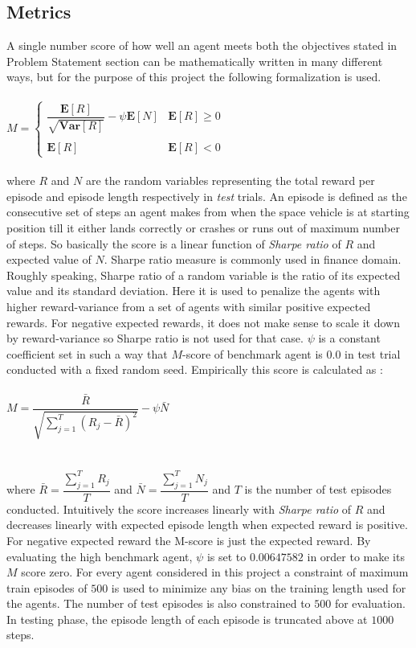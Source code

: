 \documentclass{article}
\begin{document}
\subsection*{Metrics}
A single number score of how well an agent meets both the objectives stated in Problem Statement section can be mathematically written in many different ways, but for the purpose of this project the following formalization is used.\\\\
$M = \begin{cases} \dfrac{\mathbf{E}[R]}{\sqrt{\mathbf{Var}[R]}} - \psi \mathbf{E}[N] & \mathbf{E}[R] \ge 0\\\\
 \mathbf{E}[R] & \mathbf{E}[R] < 0 \end{cases}$\\\\
where $R$ and $N$ are the random variables representing the total reward per episode and episode length respectively in \textit{test} trials. An episode is defined as the consecutive set of steps an agent makes from when the space vehicle is at starting position till it either lands correctly or crashes or runs out of maximum number of steps. So basically the score is a linear function of \textit{Sharpe ratio} of $R$ and expected value of $N$. Sharpe ratio measure is commonly used in finance domain. Roughly speaking, Sharpe ratio of a random variable is the ratio of its expected value and its standard deviation. Here it is used to penalize the agents with higher reward-variance from a set of agents with similar positive expected rewards. For negative expected rewards, it does not make sense to scale it down by reward-variance so Sharpe ratio is not used for that case. $\psi$ is a constant coefficient set in such a way that $M$-score of benchmark agent is 0.0 in test trial conducted with a fixed random seed. Empirically this score is calculated as :\\\\
$M = \dfrac{\bar{R}}{\sqrt{\sum_{j=1}^{T} \left( R_j - \bar{R}\right)^2}} - \psi \bar{N}$\\\\\\
where $\bar{R} = \dfrac{\sum_{j=1}^{T} R_j}{T}$ and $\bar{N} = \dfrac{\sum_{j=1}^{T} N_j}{T}$ and $T$ is the number of test episodes conducted. Intuitively the score increases linearly with \textit{Sharpe ratio} of $R$ and decreases linearly with expected episode length when expected reward is positive. For negative expected reward the M-score is just the expected reward.
By evaluating the high benchmark agent, $\psi$ is set to $0.00647582$ in order to make its $M$ score zero. For every agent considered in this project a constraint of maximum train episodes of $500$ is used to minimize any bias on the training length used for the agents. The number of test episodes is also constrained to $500$ for evaluation. In testing phase, the episode length of each episode is truncated above at $1000$ steps.
\end{document}
